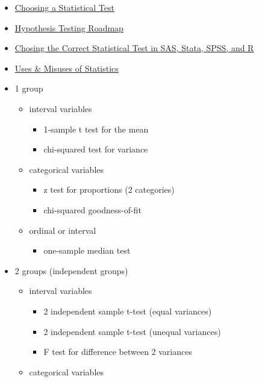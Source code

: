\documentclass[]{book}
\providecommand{\tightlist}{%
  \setlength{\itemsep}{0pt}\setlength{\parskip}{0pt}}
\begin{document}
\begin{itemize}
\item
  \href{http://rcompanion.org/handbook/D_03.html}{Choosing a Statistical Test}
\item
  \href{http://www.bmgi.org/sites/bmgi.org/files/HTR\%20MT17.pdf}{Hypothesis Testing Roadmap}
\item
  \href{https://stats.idre.ucla.edu/other/mult-pkg/whatstat/}{Chosing the Correct Statistical Test in SAS, Stata, SPSS, and R}
\item
  \href{http://influentialpoints.com/Training/statistical_mistakes_in_research_use_and_misuse_of_statistics_in_biology.htm}{Uses \& Misuses of Statistics}
\item
  1 group

  \begin{itemize}
  \tightlist
  \item
    interval variables

    \begin{itemize}
    \tightlist
    \item
      1-sample t test for the mean
    \item
      chi-squared test for variance
    \end{itemize}
  \item
    categorical variables

    \begin{itemize}
    \tightlist
    \item
      z test for proportions (2 categories)
    \item
      chi-squared goodness-of-fit
    \end{itemize}
  \item
    ordinal or interval

    \begin{itemize}
    \tightlist
    \item
      one-sample median test
    \end{itemize}
  \end{itemize}
\item
  2 groups (independent groups)

  \begin{itemize}
  \tightlist
  \item
    interval variables

    \begin{itemize}
    \tightlist
    \item
      2 independent sample t-test (equal variances)
    \item
      2 independent sample t-test (unequal variances)
    \item
      F test for difference between 2 variances
    \end{itemize}
  \item
    categorical variables


\end{itemize}
\end{itemize}
\end{document}
